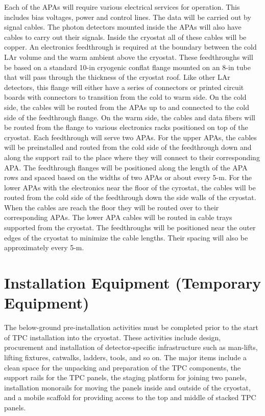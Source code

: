 Each of the APAs will require various electrical services for operation.  This includes bias voltages, power and control lines.  The data will be carried out by signal cables.  The photon detectors mounted inside the APAs will also have cables to carry out their signals.  Inside the cryostat all of these cables will be copper.  
An electronics feedthrough is required at the boundary between the cold LAr volume and the warm ambient above the cryostat.  These feedthroughs will be based on a standard 10-in cryogenic conflat flange mounted on an 8-in tube that will pass through the thickness of the cryostat roof.  Like other LAr detectors, this flange will either have a series of connectors or printed circuit boards with connectors to transition from the cold to warm side.  On the cold side, the cables will be routed from the APAs up to and connected to the cold side of the feedthrough flange.  On the warm side, the cables and data fibers will be routed from the flange to various electronics racks positioned on top of the cryostat.  
Each feedthrough will serve two APAs.  For the upper APAs, the cables will be preinstalled and routed from the cold side of the feedthrough down and along the support rail to the place where they will connect to their corresponding APA.  The feedthrough flanges will be positioned along the length of the APA rows and spaced based on the widths of two APAs or about every 5-m.   For the lower APAs with the electronics near the floor of the cyrostat, the cables will be routed from the cold side of the feedthrough down the side walls of the cryostat.  When the cables are reach the floor they will be routed over to their corresponding APAs.  The lower APA cables will be routed in cable trays supported from the cryostat.  The feedthroughs will be positioned near the outer edges of the cryostat to minimize the cable lengths.  Their spacing will also be approximately every 5-m.  


\section{Installation Equipment (Temporary Equipment)}
\label{fd:install:tempeqp}

The below-ground pre-installation activities must be completed prior to the start of TPC installation into the cryostat. These activities include design, procurement and installation of detector-specific 
infrastructure such as man-lifts, lifting fixtures, catwalks, ladders, tools, and so on. The major items include a clean space for the unpacking and preparation of the TPC components, the support rails for the 
TPC panels, the staging platform for joining two panels, installation monorails for moving the panels inside and outside of the cryostat, and a mobile scaffold for providing access to 
the top and middle of stacked TPC panels. 

